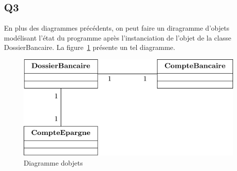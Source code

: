 \documentclass[12pt]{article}
\begin{document}
\subsection{Q3}

En plus des diagrammes précédents, on peut faire un diragramme d'objets modélisant l'état du programme après l'instanciation de l'objet de la classe DossierBancaire.
La figure~\ref{UO1} présente un tel diagramme. 
\begin{figure}[h]
    \centering
    \includegraphics{Diagrammes/UML_UO1.pdf}
    \caption{Diagramme d\textquotesingle objets\label{UO1}}
\end{figure}
\end{document}
